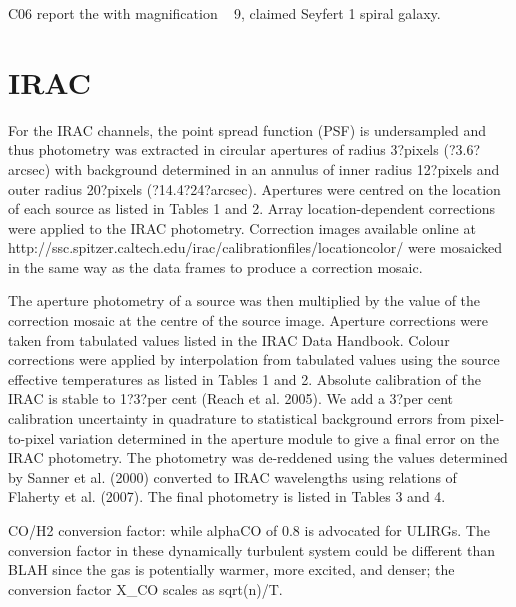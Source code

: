 C06 report the with magnification ~ 9, claimed Seyfert 1 spiral galaxy.




\section{IRAC}
For the IRAC channels, the point spread function (PSF) is undersampled and thus photometry was extracted in circular apertures of radius 3?pixels (?3.6?arcsec) with background determined in an annulus of inner radius 12?pixels and outer radius 20?pixels (?14.4?24?arcsec). Apertures were centred on the location of each source as listed in Tables 1 and 2. Array location-dependent corrections were applied to the IRAC photometry. Correction images available online at http://ssc.spitzer.caltech.edu/irac/calibrationfiles/locationcolor/ were mosaicked in the same way as the data frames to produce a correction mosaic.

The aperture photometry of a source was then multiplied by the value of the correction mosaic at the centre of the source image. Aperture corrections were taken from tabulated values listed in the IRAC Data Handbook. Colour corrections were applied by interpolation from tabulated values using the source effective temperatures as listed in Tables 1 and 2.  Absolute calibration of the IRAC is stable to 1?3?per cent (Reach et al. 2005). We add a 3?per cent calibration uncertainty in quadrature to statistical background errors from pixel-to-pixel variation determined in the aperture module to give a final error on the IRAC photometry. The photometry was de-reddened using the values determined by Sanner et al. (2000) converted to IRAC wavelengths using relations of Flaherty et al. (2007). The final photometry is listed in Tables 3 and 4.

CO/H2 conversion factor:
while alphaCO of 0.8 is advocated for ULIRGs.
The conversion factor in these dynamically turbulent system could be different than BLAH since the gas is potentially warmer, more excited, and denser; the conversion factor X\_CO scales as sqrt(n)/T.




